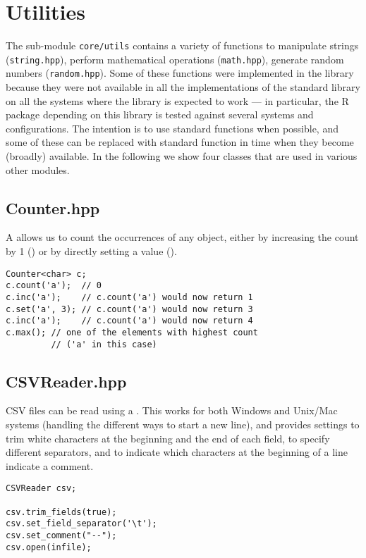 \section{Utilities}

The sub-module \texttt{core/utils} contains a variety of functions to manipulate strings (\texttt{string.hpp}), perform mathematical operations (\texttt{math.hpp}), generate random numbers (\texttt{random.hpp}). Some of these functions were implemented in the library because they were not available in all the implementations of the standard library on all the systems where the library is expected to work --- in particular, the R package depending on this library is tested against several systems and configurations. The intention is to use standard functions when possible, and some of these can be replaced with standard function in time when they become (broadly) available. In the following we show four classes that are used in various other modules.


\subsection{Counter.hpp}

A  allows us to count the occurrences of any object, either by increasing the count by 1 () or by directly setting a value ().
\begin{lstlisting}[style=c++]
Counter<char> c;
c.count('a');  // 0
c.inc('a');    // c.count('a') would now return 1
c.set('a', 3); // c.count('a') would now return 3
c.inc('a');    // c.count('a') would now return 4
c.max(); // one of the elements with highest count 
         // ('a' in this case)
\end{lstlisting}


\subsection{CSVReader.hpp}

CSV files can be read using a . This works
for both Windows and Unix/Mac systems (handling the different ways to start a new line), and provides settings to trim white characters at the beginning and the end of each field, to specify different separators, and to indicate which characters at
the beginning of a line indicate a comment.

\begin{lstlisting}[style=c++]
CSVReader csv;

csv.trim_fields(true);
csv.set_field_separator('\t');
csv.set_comment("--");
csv.open(infile);
\end{lstlisting}

